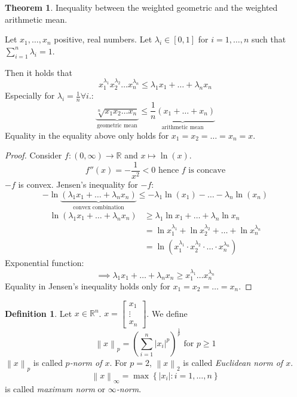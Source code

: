 \documentclass[a4paper,landscape,twocolumn]{article}
\theoremstyle{definition}
\newtheorem{theorem}{Theorem}
\newtheorem{defi}{Definition}
\newcommand\set[1]{\left\{#1\right\}}
\newcommand\abs[1]{\left|#1\right|}
\newcommand\norm[1]{\left\|#1\right\|}
\begin{document}
\begin{theorem}
  Inequality between the weighted geometric and the weighted arithmetic mean.

  Let $x_1, \ldots, x_n$ positive, real numbers.
  Let $\lambda_i \in [0,1]$ for $i = 1, \ldots, n$
  such that $\sum_{i=1}^n \lambda_i = 1$.

  Then it holds that
  \[
    x_1^{\lambda_1} x_2^{\lambda_2} \ldots x_n^{\lambda_n}
    \leq \lambda_1 x_1 + \ldots + \lambda_n x_n
  \]
  Especially for $\lambda_i = \frac1n \forall i$.:
  \[
    \underbrace{\sqrt[n]{x_1 x_2 \ldots x_n}}_{\text{geometric mean}}
    \leq
    \underbrace{\frac1n \left(x_1 + \ldots + x_n\right)}_{\text{arithmetic mean}}
  \]
  Equality in the equality above only holds for
  $x_1 = x_2 = \ldots = x_n = x$.
\end{theorem}
\begin{proof}
  Consider $f: (0,\infty) \to \mathbb R$ and $x \mapsto \ln(x)$.
  \[ f''(x) = -\frac1{x^2} < 0 \text{ hence $f$ is concave} \]
  $-f$ is convex. Jensen's inequality for $-f$:
  \[
    -\ln\underbrace{(\lambda_1 x_1 + \ldots + \lambda_n x_n)}_{\text{convex combination}}
    \leq
    - \lambda_1 \ln(x_1) - \ldots - \lambda_n \ln(x_n)
  \] \begin{align*}
    \ln(\lambda_1 x_1 + \ldots + \lambda_n x_n)
      &\geq \lambda_1 \ln{x_1} + \ldots + \lambda_n \ln{x_n} \\
      &= \ln{x_1^{\lambda_1}} + \ln{x_2^{\lambda_2}} + \ldots + \ln{x_n^{\lambda_n}} \\
      &= \ln(x_1^{\lambda_1} \cdot x_2^{\lambda_2} \cdot \ldots \cdot x_n^{\lambda_n})
  \end{align*}
  Exponential function:
  \[ \implies \lambda_1 x_1 + \ldots + \lambda_n x_n \geq x_1^{\lambda_1} \ldots x_n^{\lambda_n} \]
  Equality in Jensen's inequality holds only for $x_1 = x_2 = \ldots = x_n$.
\end{proof}
\begin{defi}
  Let $x \in \mathbb R^n$. $x = \begin{bmatrix} x_1 \\ \vdots \\ x_n \end{bmatrix}$.
  We define
  \[ \norm{x}_p = \left(\sum_{i=1}^n \abs{x_i}^p\right)^{\frac1p} \text{ for } p \geq 1 \]
  $\norm{x}_p$ is called \emph{$p$-norm of $x$}.
  For $p=2$, $\norm{x}_2$ is called \emph{Euclidean norm of $x$}.
  \[ \norm{x}_\infty = \max\set{\abs{x_i}: i = 1, \ldots, n} \]
  is called \emph{maximum norm} or \emph{$\infty$-norm}.
\end{defi}


\clearpage
\begin{otherlanguage}{ngerman}
\printindex[German]
\end{otherlanguage}
\printindex[English]
\end{document}
